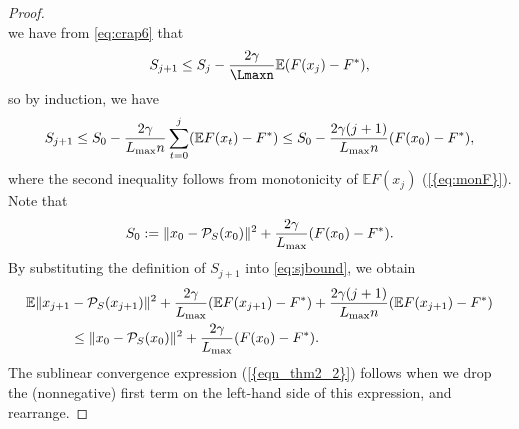 \documentclass{siamltex}
\begin{document}
\begin{proof}
\begin{equation}
\end{equation}
we have from \eqref{eq:crap6} that
\begin{equation} \label{eq:recursj}
S_{j+1}\leq S_j-{2\gamma\over \Lmaxn}{\mathbb{E}} (F(x_j)-F^*),
\end{equation}
so by induction, we have
\begin{equation} \label{eq:sjbound}
S_{j+1} \leq S_0 - {2\gamma\over {L_{\mbox{\rm\scriptsize max}}} n} \sum_{t=0}^{j}({\mathbb{E}} F(x_t) - F^*) \le
 S_0 - {2\gamma (j+1) \over {L_{\mbox{\rm\scriptsize max}}} n} (F(x_0)-F^*),
\end{equation}
where the second inequality follows from monotonicity of ${\mathbb{E}} F(x_j)$
{(\ref{{eq:monF}})}. Note that
\[
S_0:=\|x_0-{\mathcal{P}_{S}}(x_0)\|^2 + {2\gamma \over {L_{\mbox{\rm\scriptsize max}}}} (F(x_0)-F^*).
\]
By substituting the definition of $S_{j+1}$ into \eqref{eq:sjbound},
we obtain
\begin{align*}
{\mathbb{E}}\|x_{j+1} & - {\mathcal{P}_{S}}(x_{j+1})\|^2 + \frac{2\gamma}{L_{\mbox{\rm\scriptsize max}}}({\mathbb{E}}
    F(x_{j+1}) -F^*) + \frac{2\gamma (j+1)}{L_{\max}n}({\mathbb{E}} F(x_{j+1})-
    F^*)\\ 
& \leq \| x_0-{\mathcal{P}_{S}}(x_0)\|^2 +  \frac{2\gamma}{L_{\mbox{\rm\scriptsize max}}}(F(x_0) - F^*).
\end{align*}
The sublinear convergence expression {(\ref{{eqn_thm2_2}})} follows when
we drop the (nonnegative) first term on the left-hand side of this
expression, and rearrange.


\end{proof}
\end{document}
